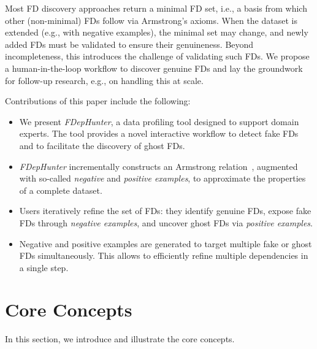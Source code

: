 
Most FD discovery approaches return a minimal FD set, i.e., a basis from which other (non-minimal) FDs follow via Armstrong’s axioms. When the dataset is extended (e.g., with negative examples), the minimal set may change, and newly added FDs must be validated to ensure their genuineness. Beyond incompleteness, this introduces the challenge of validating such FDs. We propose a human-in-the-loop workflow to discover genuine FDs and lay the groundwork for follow-up research, e.g., on handling this at scale.

Contributions of this paper include the following:
\begin{itemize}
    \item We present \emph{FDepHunter}, a data profiling tool designed to support domain experts. The tool provides a novel interactive workflow to detect fake FDs and to facilitate the discovery of ghost FDs.
    \item \emph{FDepHunter} incrementally constructs an Armstrong relation~\citep{DBLP:books/aw/AbiteboulHV95}, augmented with so-called \emph{negative} and \emph{positive examples}, to approximate the properties of a complete dataset.
    \item %
    Users iteratively refine the set of FDs: 
    they identify genuine FDs, expose fake FDs through \emph{negative examples}, and uncover ghost FDs via \emph{positive examples}.
    \item Negative and positive examples are generated to target multiple fake or ghost FDs simultaneously. This allows to efficiently refine multiple dependencies in a single step.
\end{itemize}  

\section{Core Concepts}


In this section, we introduce and illustrate the core concepts.

